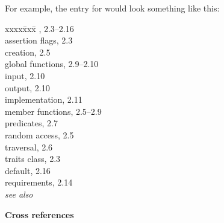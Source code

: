 \documentclass[11pt]{article}
\newenvironment{indexex}{\begin{tabbing}
xxxx\=xxx\=\kill}{\end{tabbing}}
\begin{document}
\begin{description}
      For example, the entry for  would 
      look something like this:
      \begin{indexex}
          ,       2.3--2.16   \\
          \> assertion flags,                  2.3      \\
          \> creation,                         2.5      \\
          \> global functions,                 2.9--2.10 \\
          \>\> input,                               2.10  \\
          \>\> output,                              2.10  \\
          \> implementation,                   2.11     \\
          \> member functions,                 2.5--2.9 \\
          \>\> predicates,                     2.7      \\
          \>\> random access,                  2.5      \\
          \>\> traversal,                        2.6    \\
          \> traits class,                       2.3  \\
          \>\> default,                          2.16 \\
          \>\> requirements,                     2.14 \\
          \>\> {\em see also}   \\
     \end{indexex}


   \item {\bf Cross references}


\end{description}
\end{document}
